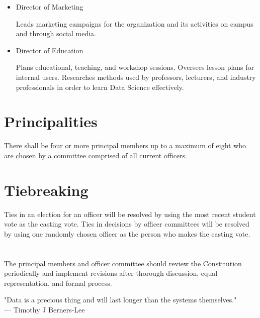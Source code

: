\documentclass[12pt]{constitution}
\begin{document}
{\begin{itemize}
        \item Director of Marketing {
        
        \par\indent
        	Leads marketing campaigns for the organization and its activities on campus and through social media.
        }
        
        \item Director of Education {
        
        \par\indent
        	Plans educational, teaching, and workshop sessions. Oversees lesson plans for internal users. Researches methods used by professors, lecturers, and industry professionals in order to learn Data Science effectively.
        }
        
	\end{itemize}
}

\section{Principalities}
There shall be four or more principal members up to a maximum of eight who are chosen by a committee comprised of all current officers.


\section{Tiebreaking}
Ties in an election for an officer will be resolved by using the most recent student vote as the casting vote. Ties in decisions by officer committees will be resolved by using one randomly chosen officer as the person who makes the casting vote.

\section{} The principal members and officer committee should review the Constitution periodically and implement revisions after thorough discussion, equal representation, and formal process.


\begin{center}
    "Data is a precious thing and will last longer than the systems themselves."\\
    --- Timothy J Berners-Lee
\end{center}
\end{document}
